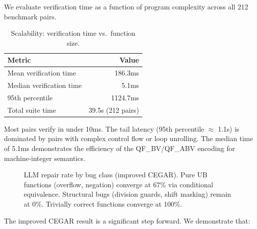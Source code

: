\documentclass[11pt]{article}
\newcommand{\qfbv}{\textsf{QF\_BV}}
\begin{document}
We evaluate verification time as a function of program complexity
across all 212 benchmark pairs.

\begin{table}[t]
\centering
\caption{Scalability: verification time vs.\ function size.}\label{tab:scalability}
\begin{tabular}{@{}lr@{}}
\toprule
\textbf{Metric} & \textbf{Value} \\
\midrule
Mean verification time & 186.3ms \\
Median verification time & 5.1ms \\
95th percentile & 1124.7ms \\
Total suite time & 39.5s (212 pairs) \\
\bottomrule
\end{tabular}
\end{table}

Most pairs verify in under 10ms.  The tail latency (95th percentile $\approx$
1.1s) is dominated by pairs with complex control flow or loop unrolling.
The median time of 5.1ms demonstrates the efficiency of the \qfbv{}/QF\_ABV
encoding for machine-integer semantics.

\begin{figure}[t]
\centering
{}
\caption{LLM repair rate by bug class (improved CEGAR).  Pure UB functions
         (overflow, negation) converge at 67\% via conditional equivalence.
         Structural bugs (division guards, shift masking) remain at 0\%.
         Trivially correct functions converge at 100\%.}\label{fig:repair-bar}
\end{figure}

The improved CEGAR result is a significant step forward.  We demonstrate that:
\end{document}
